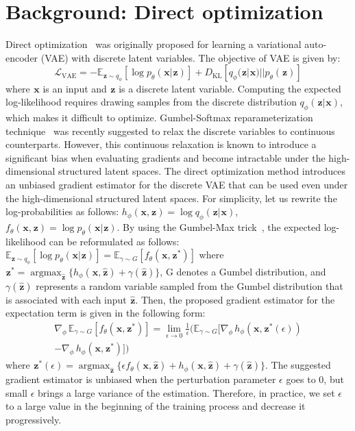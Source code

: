 \documentclass[10pt,twocolumn,letterpaper]{article}
\newcommand{\varx}{\mathbf{\mspace{1mu}x}}
\newcommand{\varz}{\mathbf{\mspace{1mu}z}}
\DeclareMathOperator*{\argmax}{argmax}
\begin{document}
\section{Background: Direct optimization} \label{sec:background}
Direct optimization~\cite{lorberbom2018direct} was originally proposed for learning a variational auto-encoder (VAE) with discrete latent variables. The objective of VAE is given by:
\begin{equation}
\label{eq:vae-loss}
\mathcal{L}_{\text{VAE}}=-\mathbb{E}_{\varz \sim q_{\phi}}[\log p_{\theta}(\varx|\varz)] + D_{\mathrm{KL}}[q_{\phi}(\varz|\varx)||p_{\theta}(\varz)]
\end{equation}
where $\varx$ is an input and $\varz$ is a discrete latent variable. Computing the expected log-likelihood requires drawing samples from the discrete distribution $q_{\phi}(\varz|\varx)$, which makes it difficult to optimize. Gumbel-Softmax reparameterization technique~\cite{jang2016categorical,maddison2016concrete} was recently suggested to relax the discrete variables to continuous counterparts. However, this continuous relaxation is known to introduce a significant bias when evaluating gradients and become intractable under the high-dimensional structured latent spaces. The direct optimization method introduces an unbiased gradient estimator for the discrete VAE that can be used even under the high-dimensional structured latent spaces. For simplicity, let us rewrite the log-probabilities as follows: $h_{\phi}(\varx, \varz)=\log q_{\phi}(\varz|\varx)$, $f_{\theta}(\varx, \varz)=\log p_{\theta}(\varx|\varz)$. By using the Gumbel-Max trick~\cite{maddison2014sampling}, the expected log-likelihood can be reformulated as follows: $\mathbb{E}_{\varz \sim q_{\phi}}[\log p_{\theta}(\varx|\varz)] = \mathbb{E}_{\gamma \sim G}[f_{\theta}(\varx,\varz^*)]$ where $\varz^*=\argmax_{\hat{\varz}} \{ h_{\phi}(\varx,\hat{\varz}) +\gamma(\hat{\varz})\}$, G denotes a Gumbel distribution, and $\gamma(\hat{\varz})$ represents a random variable sampled from the Gumbel distribution that is associated with each input $\hat{\varz}$. Then, the proposed gradient estimator for the expectation term is given in the following form:
\begin{multline}
\label{eq:vae-direct}
\nabla_{\phi} \, \mathbb{E}_{\gamma \sim G}[f_{\theta}(\varx,\varz^*)] =  \lim\limits_{\epsilon \to 0} \frac{1}{\epsilon} \Big( \mathbb{E}_{\gamma \sim G}\big[\nabla_{\phi} \, h_{\phi} (\varx,\varz^*(\epsilon))
\\ - \nabla_{\phi} \, h_{\phi}(\varx,\varz^*) \big] \Big)
\end{multline}
where $\varz^*(\epsilon)=\argmax_{\hat{\varz}} \{ \epsilon f_{\theta}(\varx,\hat{\varz}) +  h_{\phi}(\varx,\hat{\varz}) +\gamma(\hat{\varz})\}$. The suggested gradient estimator is unbiased when the perturbation parameter $\epsilon$ goes to 0, but small $\epsilon$ brings a large variance of the estimation. Therefore, in practice, we set $\epsilon$ to a large value in the beginning of the training process and decrease it progressively.
\end{document}
